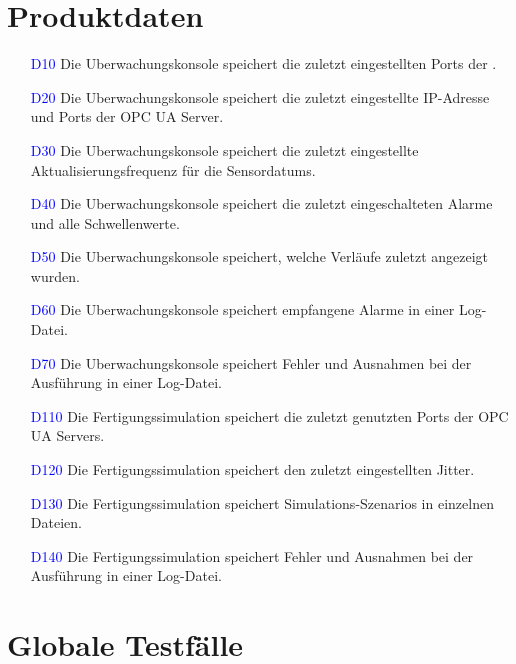 \documentclass[parskip=full]{scrartcl}
\begin{document}
\section{Produktdaten}
\begin{enumerate}
  \item[\textcolor{blue}{D10}] Die \gls{Uberwachungskonsole} speichert die zuletzt eingestellten Ports der .
  \item[\textcolor{blue}{D20}] Die \gls{Uberwachungskonsole} speichert die zuletzt eingestellte IP-Adresse und Ports der \gls{OPC UA Server}.
  \item[\textcolor{blue}{D30}] Die \gls{Uberwachungskonsole} speichert die zuletzt eingestellte Aktualisierungsfrequenz für die \glspl{Sensordatum}.
  \item[\textcolor{blue}{D40}] Die \gls{Uberwachungskonsole} speichert die zuletzt eingeschalteten Alarme und alle Schwellenwerte.
  \item[\textcolor{blue}{D50}] Die \gls{Uberwachungskonsole} speichert, welche Verläufe zuletzt angezeigt wurden.
  \item[\textcolor{blue}{D60}] Die \gls{Uberwachungskonsole} speichert empfangene Alarme in einer Log-Datei.
  \item[\textcolor{blue}{D70}] Die \gls{Uberwachungskonsole} speichert Fehler und Ausnahmen bei der Ausführung in einer Log-Datei.
  \item[\textcolor{blue}{D110}] Die \gls{Fertigungssimulation} speichert die zuletzt genutzten Ports der \glspl{OPC UA Server}.
  \item[\textcolor{blue}{D120}] Die \gls{Fertigungssimulation} speichert den zuletzt eingestellten \gls{Jitter}.
  \item[\textcolor{blue}{D130}] Die \gls{Fertigungssimulation} speichert \glspl{Simulations-Szenario} in einzelnen Dateien.
  \item[\textcolor{blue}{D140}] Die \gls{Fertigungssimulation} speichert Fehler und Ausnahmen bei der Ausführung in einer Log-Datei.
\end{enumerate}

\pagebreak
\section{Globale Testfälle}
\end{document}
